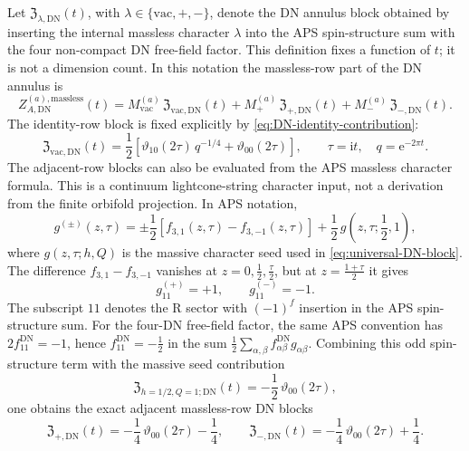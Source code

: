 \documentclass[11pt]{article}
\newcommand{\vac}{\mathrm{vac}}
\newcommand{\DN}{\mathrm{DN}}
\newcommand{\ii}{\mathrm{i}}
\newcommand{\e}{\mathrm{e}}
\newcommand{\vart}{\vartheta}
\begin{document}
Let \(\mathfrak Z_{\lambda,\DN}(t)\), with
\(\lambda\in\{\vac,+,-\}\), denote the DN annulus block obtained by inserting the internal
massless character \(\lambda\) into the APS spin-structure sum with the four non-compact DN
free-field factor. This definition fixes a function of \(t\); it is not a dimension count. In
this notation the massless-row part of the DN annulus is
\begin{equation}
  Z_{A,\DN}^{(a),\mathrm{massless}}(t)
  =
  M_{\vac}^{(a)}\,\mathfrak Z_{\vac,\DN}(t)
  +
  M_{+}^{(a)}\,\mathfrak Z_{+,\DN}(t)
  +
  M_{-}^{(a)}\,\mathfrak Z_{-,\DN}(t).
  \label{eq:DN-massless-row-annulus-ledger}
\end{equation}
The identity-row block is fixed explicitly by \eqref{eq:DN-identity-contribution}:
\begin{equation}
  \mathfrak Z_{\vac,\DN}(t)
  =
  \frac12\left[
    \vart_{10}(2\tau)\,q^{-1/4}
    +
    \vart_{00}(2\tau)
  \right],
  \qquad
  \tau=\ii t,\quad q=\e^{-2\pi t}.
  \label{eq:DN-vac-row-block}
\end{equation}
The adjacent-row blocks can also be evaluated from the APS massless character formula. This is a
continuum lightcone-string character input, not a derivation from the finite orbifold
projection. In APS notation,
\begin{equation}
  g^{(\pm)}(z,\tau)
  =
  \pm\frac12\left[f_{3,1}(z,\tau)-f_{3,-1}(z,\tau)\right]
  +
  \frac12\,g\!\left(z,\tau;\frac12,1\right),
  \label{eq:APS-adjacent-massless-character}
\end{equation}
where \(g(z,\tau;h,Q)\) is the massive character seed used in
\eqref{eq:universal-DN-block}. The difference
\(f_{3,1}-f_{3,-1}\) vanishes at \(z=0,\frac12,\frac{\tau}{2}\), but at
\(z=\frac{1+\tau}{2}\) it gives
\begin{equation}
  g^{(+)}_{11}=+1,
  \qquad
  g^{(-)}_{11}=-1.
  \label{eq:adjacent-massless-odd-spin-values}
\end{equation}
The subscript \(11\) denotes the R sector with \((-1)^f\) insertion in the APS spin-structure
sum. For the four-DN free-field factor, the same APS convention has \(2f_{11}^{\DN}=-1\), hence
\(f_{11}^{\DN}=-\frac12\) in the sum
\(\frac12\sum_{\alpha,\beta}f_{\alpha\beta}^{\DN}g_{\alpha\beta}\). Combining this odd
spin-structure term with the massive seed contribution
\[
  \mathfrak Z_{h=1/2,Q=1;\DN}(t)
  =
  -\frac12\,\vart_{00}(2\tau),
\]
one obtains the exact adjacent massless-row DN blocks
\begin{equation}
  \mathfrak Z_{+,\DN}(t)
  =
  -\frac14\,\vart_{00}(2\tau)-\frac14,
  \qquad
  \mathfrak Z_{-,\DN}(t)
  =
  -\frac14\,\vart_{00}(2\tau)+\frac14.
  \label{eq:DN-adjacent-row-blocks}
\end{equation}
\end{document}
